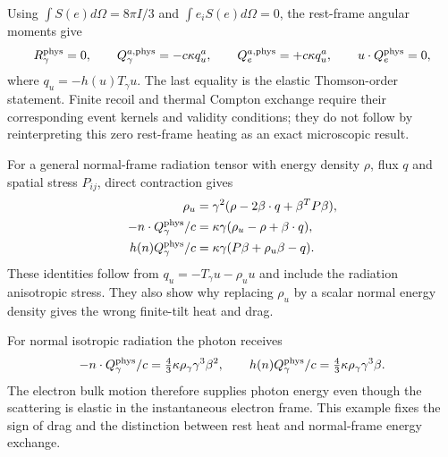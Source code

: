 Using $\int S(e)d\Omega=8\pi I/3$ and $\int e_iS(e)d\Omega=0$, the rest-frame angular moments give
\begin{equation}
 R_\gamma^{\rm phys}=0,\qquad
 Q_\gamma^{a,\rm phys}=-c\kappa q_u^a,\qquad
 Q_e^{a,\rm phys}=+c\kappa q_u^a,\qquad u\cdot Q_e^{\rm phys}=0,
 \label{ii:thomson_source}
\end{equation}
where $q_u=-h(u)T_\gamma u$. The last equality is the elastic Thomson-order statement. Finite recoil and thermal Compton exchange require their corresponding event kernels and validity conditions; they do not follow by reinterpreting this zero rest-frame heating as an exact microscopic result.


For a general normal-frame radiation tensor with energy density $\rho$, flux $q$ and spatial stress $P_{ij}$, direct contraction gives
\begin{align}
 \rho_u&=\gamma^2(\rho-2\beta\cdot q+\beta^TP\beta),\nonumber\\
 -n\cdot Q_\gamma^{\rm phys}/c&=\kappa\gamma(\rho_u-\rho+\beta\cdot q),\nonumber\\
 h(n)Q_\gamma^{\rm phys}/c&=\kappa\gamma(P\beta+\rho_u\beta-q).
 \label{ii:general_thomson_force}
\end{align}
These identities follow from $q_u=-T_\gamma u-\rho_u u$ and include the radiation anisotropic stress. They also show why replacing $\rho_u$ by a scalar normal energy density gives the wrong finite-tilt heat and drag.

For normal isotropic radiation the photon receives
\begin{equation}
 -n\cdot Q_\gamma^{\rm phys}/c
       =\tfrac43\kappa\rho_\gamma\gamma^3\beta^2,\qquad
 h(n)Q_\gamma^{\rm phys}/c
       =\tfrac43\kappa\rho_\gamma\gamma^3\beta.
 \label{ii:bulk_compton}
\end{equation}
The electron bulk motion therefore supplies photon energy even though the scattering is elastic in the instantaneous electron frame. This example fixes the sign of drag and the distinction between rest heat and normal-frame energy exchange.

